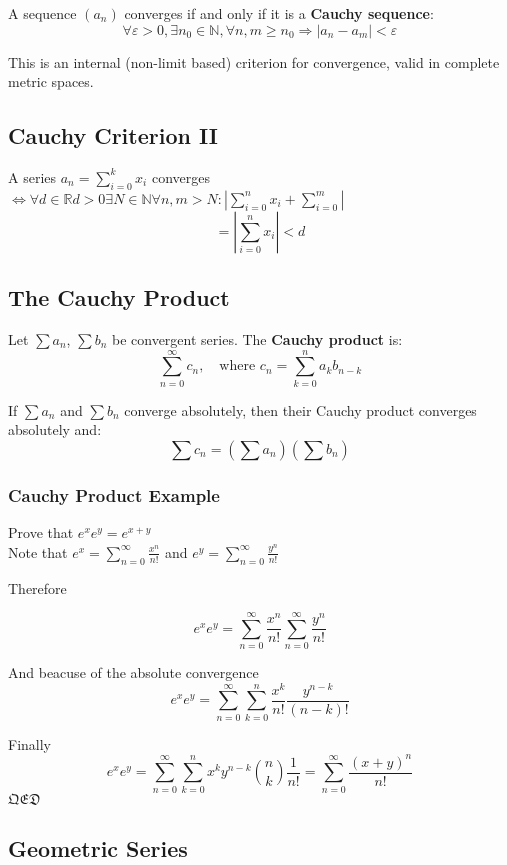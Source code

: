 A sequence \((a_n)\) converges if and only if it is a \textbf{Cauchy sequence}:
\[
\forall \varepsilon > 0, \exists n_0 \in \mathbb{N}, \forall n, m \ge n_0 \Rightarrow |a_n - a_m| < \varepsilon
\]

This is an internal (non-limit based) criterion for convergence, valid in complete metric spaces.

\subsection{Cauchy Criterion II}
A series \(a_n = \sum_{i = 0}^{k}x_i\) converges \(\iff \forall d \in \mathbb{R} d > 0 
\exists N \in \mathbb{N} \forall n,m > N: \left| \sum_{i = 0}^{n}x_i + \sum_{i=0}^{m}\right|\)
\[= \left|\sum_{i = 0}^{n}x_i\right| < d\]


\subsection{The Cauchy Product}

Let \(\sum a_n\), \(\sum b_n\) be convergent series. The \textbf{Cauchy product} is:
\[
\sum_{n=0}^\infty c_n, \quad \text{where } c_n = \sum_{k=0}^n a_k b_{n-k}
\]

If \(\sum a_n\) and \(\sum b_n\) converge absolutely, then their Cauchy product converges absolutely and:
\[
\sum c_n = \left( \sum a_n \right) \left( \sum b_n \right)
\]

\subsubsection{Cauchy Product Example}

Prove that \(e^x  e^y = e^{x + y}\)\\
Note that \(e^x = \sum_{n = 0}^{\infty} \frac{x^n}{n!}\) and \(e^y = \sum_{n = 0}^{\infty} \frac{y^n}{n!}\)

Therefore

\[
  e^x e^y = \sum_{n = 0}^{\infty} \frac{x^n}{n!} \sum_{n = 0}^{\infty} \frac{y^n}{n!}
\]

And beacuse of the absolute convergence
\[
  e^x e^y = \sum_{n = 0}^{\infty}\sum_{k = 0}^{n} \frac{x^k}{n!} \frac{y^{n - k}}{(n-k)!}
\]

Finally
\[
  e^x e^y = \sum_{n = 0}^{\infty}\sum_{k = 0}^{n}x^k y^{n - k} \binom{n}{k} \frac{1}{n!} = \sum_{n = 0}^{\infty} \frac{(x + y)^n}{n!}
\]
\(\mathfrak{QED}\)
\subsection{Geometric Series}

